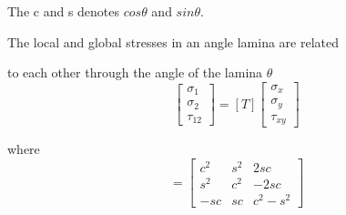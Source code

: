 \documentclass[USenglish,twocolumn]{article}
\begin{document}
The c and s denotes $cos\theta $ and $sin\theta $.

The local and global stresses in an angle lamina are related

to each other through the angle of the lamina $\theta $
\begin{equation}\left[\begin{array}{l}\sigma _{1} \\ \sigma _{2} \\ \tau_{12}\end{array}\right]=[T]\left[\begin{array}{l}\sigma _{x} \\ \sigma _{y} \\\tau_{xy}\end{array}\right]
\end{equation}

where
\begin{equation}[T]=\left[\begin{array}{ccc}c^{2} & s^{2} & 2 s c \\ s^{2} & c^{2} & -2 s c \\ -s c & s c &c^{2}-s^{2}\end{array}\right] 
\end{equation}
\end{document}

